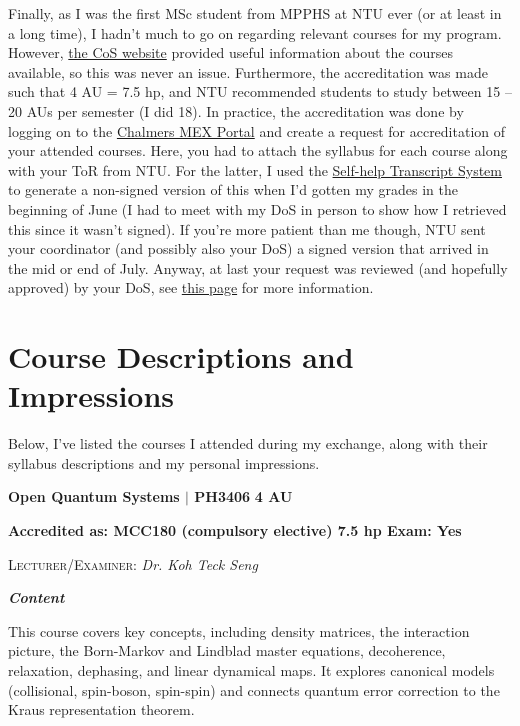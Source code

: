 Finally, as I was the first MSc student from MPPHS at NTU ever (or at least in a long time), I hadn't much to go on regarding relevant courses for my program. However, \href{https://www.ntu.edu.sg/spms}{the CoS website} provided useful information about the courses available, so this was never an issue. Furthermore, the accreditation was made such that 4 AU = 7.5 hp, and NTU recommended students to study between 15 -- 20 AUs per semester (I did 18). In practice, the accreditation was done by logging on to the \href{https://mex.portal.chalmers.se}{Chalmers MEX Portal} and create a request for accreditation of your attended courses. Here, you had to attach the syllabus for each course along with your ToR from NTU. For the latter, I used the \href{https://wis.ntu.edu.sg/webexe/owa/request_transcript_und.LoginN?pType=SH}{Self-help Transcript System} to generate a non-signed version of this when I'd gotten my grades in the beginning of June (I had to meet with my DoS in person to show how I retrieved this since it wasn't signed). If you're more patient than me though, NTU sent your coordinator (and possibly also your DoS) a signed version that arrived in the mid or end of July. Anyway, at last your request was reviewed (and hopefully approved) by your DoS, see \href{https://www.chalmers.se/en/education/your-studies/plan-and-conduct-your-studies/transferring-credits/}{this page} for more information.
\section*{Course Descriptions and Impressions}
{}
Below, I've listed the courses I attended during my exchange, along with their syllabus descriptions and my personal impressions.

\vspace{-0.3cm}
\hrulefill

{\large{\textbf{Open Quantum Systems $\vert$ PH3406} \hfill \textbf{4 AU}}}

\vspace{-0.3cm}
\textbf{Accredited as: MCC180 (compulsory elective) 7.5 hp \hfill Exam: Yes}

{\large{\textsc{Lecturer/Examiner:} \textit{Dr. Koh Teck Seng}}} \vspace{0.25cm}

{\large{\textbf{\textit{Content}}}} 
\vspace{-0.25cm}

This course covers key concepts, including density matrices, the interaction picture, the Born-Markov and Lindblad master equations, decoherence, relaxation, dephasing, and linear dynamical maps. It explores canonical models (collisional, spin-boson, spin-spin) and connects quantum error correction to the Kraus representation theorem.

